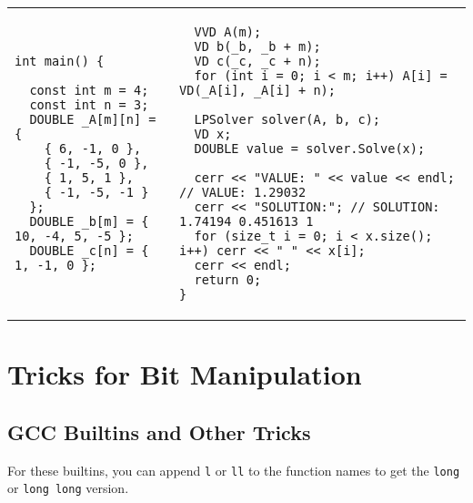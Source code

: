 \documentclass[letterpaper]{article}
\begin{document}
\begin{tabular}{@{}p{9cm}p{9cm}@{}}
    \begin{lstlisting}
int main() {

  const int m = 4;
  const int n = 3;
  DOUBLE _A[m][n] = {
    { 6, -1, 0 },
    { -1, -5, 0 },
    { 1, 5, 1 },
    { -1, -5, -1 }
  };
  DOUBLE _b[m] = { 10, -4, 5, -5 };
  DOUBLE _c[n] = { 1, -1, 0 };
\end{lstlisting}
     &
    \begin{lstlisting}
  VVD A(m);
  VD b(_b, _b + m);
  VD c(_c, _c + n);
  for (int i = 0; i < m; i++) A[i] = VD(_A[i], _A[i] + n);

  LPSolver solver(A, b, c);
  VD x;
  DOUBLE value = solver.Solve(x);

  cerr << "VALUE: " << value << endl; // VALUE: 1.29032
  cerr << "SOLUTION:"; // SOLUTION: 1.74194 0.451613 1
  for (size_t i = 0; i < x.size(); i++) cerr << " " << x[i];
  cerr << endl;
  return 0;
}
\end{lstlisting}
\end{tabular}

\clearpage

\section{Tricks for Bit Manipulation}

\subsection{GCC Builtins and Other Tricks}

For these builtins, you can append \texttt{l} or \texttt{ll} to the function names to get the \texttt{long} or \texttt{long long} version.
\end{document}
